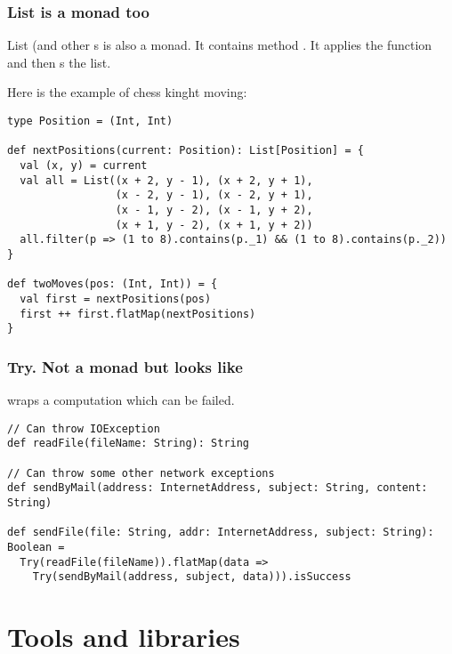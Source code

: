 \begin{frame}[fragile]
\frametitle{List is a monad too}
List (and other s is also a monad. It contains method .
It applies the function and then s the list.

Here is the example of chess kinght moving:
\begin{lstlisting}
type Position = (Int, Int)

def nextPositions(current: Position): List[Position] = {
  val (x, y) = current
  val all = List((x + 2, y - 1), (x + 2, y + 1),
                 (x - 2, y - 1), (x - 2, y + 1),
                 (x - 1, y - 2), (x - 1, y + 2),
                 (x + 1, y - 2), (x + 1, y + 2))
  all.filter(p => (1 to 8).contains(p._1) && (1 to 8).contains(p._2))
}

def twoMoves(pos: (Int, Int)) = {
  val first = nextPositions(pos)
  first ++ first.flatMap(nextPositions)
}
\end{lstlisting}

\end{frame}

\begin{frame}[fragile]
\frametitle{Try. Not a monad but looks like}

 wraps a computation which can be failed.

\begin{lstlisting}
// Can throw IOException
def readFile(fileName: String): String

// Can throw some other network exceptions
def sendByMail(address: InternetAddress, subject: String, content: String)

def sendFile(file: String, addr: InternetAddress, subject: String): Boolean =
  Try(readFile(fileName)).flatMap(data =>
    Try(sendByMail(address, subject, data))).isSuccess

\end{lstlisting}

\end{frame}

\section{Tools and libraries}

